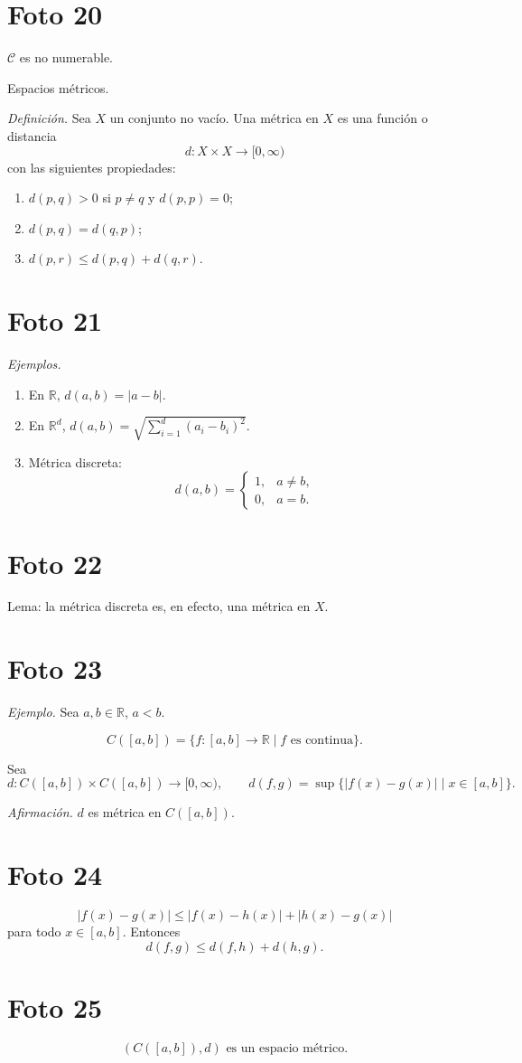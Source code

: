 \documentclass[12pt]{article}
\begin{document}
\section*{Foto 20}

$\mathcal C$ es no numerable.

Espacios m\'etricos.

\textit{Definici\'on.}
Sea $X$ un conjunto no vac\'io. Una m\'etrica en $X$ es una funci\'on o distancia
\[
d:X\times X\to[0,\infty)
\]
con las siguientes propiedades:
\begin{enumerate}[label=\roman*)]
    \item $d(p,q)>0$ si $p\neq q$ y $d(p,p)=0$;
    \item $d(p,q)=d(q,p)$;
    \item $d(p,r)\le d(p,q)+d(q,r)$.
\end{enumerate}

\section*{Foto 21}

\textit{Ejemplos.}

\begin{enumerate}[label=\arabic*.]
    \item En $\mathbb R$, $d(a,b)=|a-b|$.
    \item En $\mathbb R^d$, $d(a,b)=\sqrt{\sum_{i=1}^d(a_i-b_i)^2}$.
    \item M\'etrica discreta:
    \[
    d(a,b)=
    \begin{cases}
    1,& a\neq b,\\
    0,& a=b.
    \end{cases}
    \]
\end{enumerate}

\section*{Foto 22}

Lema: la m\'etrica discreta es, en efecto, una m\'etrica en $X$.

\section*{Foto 23}

\textit{Ejemplo.} Sea $a,b\in\mathbb R$, $a<b$.

\[
C([a,b])=\{f:[a,b]\to\mathbb R\mid f \text{ es continua}\}.
\]

Sea
\[
d:C([a,b])\times C([a,b])\to[0,\infty),
\qquad
d(f,g)=\sup\{|f(x)-g(x)|\mid x\in[a,b]\}.
\]

\textit{Afirmaci\'on.} $d$ es m\'etrica en $C([a,b])$.

\section*{Foto 24}

\[
|f(x)-g(x)|\le |f(x)-h(x)|+|h(x)-g(x)|
\]
para todo $x\in[a,b]$.
Entonces
\[
d(f,g)\le d(f,h)+d(h,g).
\]

\section*{Foto 25}

\[
(C([a,b]),d)\text{ es un espacio m\'etrico.}
\]
\end{document}
